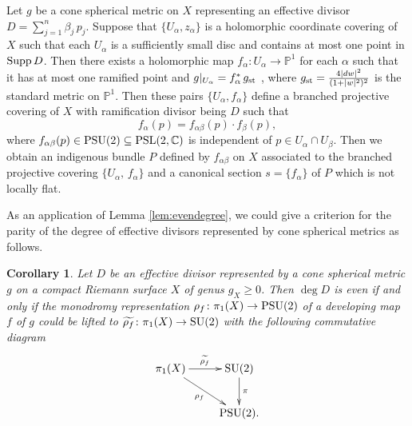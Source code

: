 \documentclass[12pt]{article}
\newtheorem{cor}{Corollary}[section]
\begin{document}
Let $g$ be a cone spherical metric on $X$ representing an effective divisor $D = \sum_{j=1}^n \beta_j \, p_j$. Suppose that $\{U_{\alpha}, z_{\alpha}\}$ is a holomorphic coordinate covering of $X$ such that each $U_\alpha$ is a sufficiently small  disc and contains at most one point in ${\rm Supp}\,D$. Then there exists a holomorphic map $f_{\alpha}\colon U_{\alpha} \rightarrow \mathbb{P}^1$ for each $\alpha$ such that it has at most one ramified point and $g|_{U_{\alpha}} = f_{\alpha}^*\,g_{\rm st}$ \cite[Lemmas 2.1 and 3.2]{CWWX2015}, where $g_{\rm st}=\frac{4|dw|^2}{(1+|w|^2)^2}$ is the standard metric on ${\mathbb P}^1$. Then these pairs $\{U_{\alpha}, f_{\alpha}\}$ define a branched projective covering of $X$ with ramification divisor being $D$ such that
  \[ f_{\alpha}(p) = f_{\alpha \beta}(p) \cdot f_{\beta}(p),  \]
where $f_{\alpha \beta}(p) \in {\rm PSU(2)} \subseteq {\rm PSL}(2, \mathbb C)$ is  independent of $p \in U_{\alpha} \cap U_{\beta}$. Then we obtain an indigenous bundle $P$ defined by $f_{\alpha \beta}$ on $X$ associated to the branched projective covering $\{U_\alpha,\, f_{\alpha}\}$ and a canonical section $s=\{f_{\alpha}\}$ of $P$ which is not locally flat.

As an application of Lemma \ref{lem:evendegree}, we could give a criterion for the parity of the degree of effective divisors represented by cone spherical metrics as follows.

\begin{cor}
\label{cor:criterion}
Let $D$ be an effective divisor represented by a cone spherical metric $g$ on a compact Riemann surface $X$ of genus $g_X\geq 0$. Then $\deg D$ is even if and only if the monodromy representation $\rho_f\colon \pi_1(X)\to {\rm PSU(2)}$ of a developing map $f$ of $g$ could be lifted to $\widetilde{\rho_f}\colon \pi_1(X)\to {\rm SU}(2)$ with the following commutative diagram
\[ \xymatrix{
  \pi_{1}(X) \ar[r]^{\widetilde{\rho_f}} \ar[rd]_{\rho _{f}} & {\rm SU(2)} \ar[d] ^{\pi} \\
                                                                                & {\rm PSU(2)}.
} \]
\end{cor}
\end{document}
